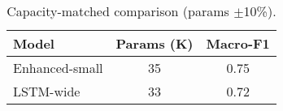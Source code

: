 \begin{table}[t]
\centering
\caption{Capacity-matched comparison (params $\pm$10\%).}
\begin{tabular}{lcc}
\toprule
Model & Params (K) & Macro-F1 \\
\midrule
Enhanced-small & 35 & 0.75 \\
LSTM-wide & 33 & 0.72 \\
\bottomrule
\end{tabular}
\end{table}
